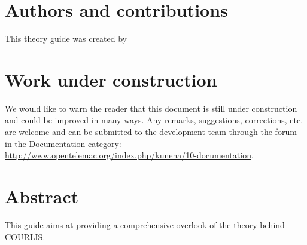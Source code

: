 \documentclass[Courlis]{../../data/TelemacDoc} %
\begin{document}
\let\cleardoublepage\clearpage

\title{\courlis}
\subtitle{Theory guide}
\version{\telmaversion}
\date{\today}
\maketitle
\clearpage


\newpage

\thispagestyle{empty}

\chapter*{Authors and contributions}
This theory guide was created by 

\newpage

\chapter*{Work under construction}\label{workunderconstruction}
We would like to warn the reader that this document is still under construction
and could be improved in many ways. Any remarks, suggestions, corrections, etc.
are welcome and can be submitted to the \telemacsystem development team through
the forum in the Documentation category:
\url{http://www.opentelemac.org/index.php/kunena/10-documentation}.

\newpage

\chapter*{Abstract}\label{Abstract}
This guide aims at providing a comprehensive overlook of the theory behind COURLIS. 



\newpage

\thispagestyle{empty}

\TelemacCopyright{}
\end{document}
